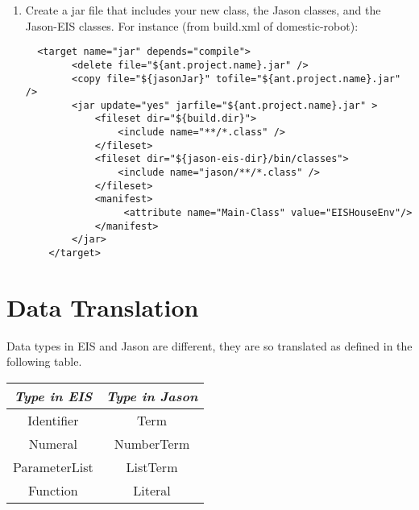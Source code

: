 \documentclass{article}
\begin{document}
\begin{enumerate}
\begin{enumerate}


\item Create a jar file that includes your new class, the Jason
  classes, and the Jason-EIS classes. For instance (from build.xml of
  domestic-robot):
\begin{verbatim}
  <target name="jar" depends="compile">
        <delete file="${ant.project.name}.jar" />
        <copy file="${jasonJar}" tofile="${ant.project.name}.jar" />
        <jar update="yes" jarfile="${ant.project.name}.jar" >
            <fileset dir="${build.dir}">
                <include name="**/*.class" />
            </fileset>
            <fileset dir="${jason-eis-dir}/bin/classes">
                <include name="jason/**/*.class" />
            </fileset>
            <manifest>
                 <attribute name="Main-Class" value="EISHouseEnv"/>
            </manifest>
        </jar>      
    </target>
\end{verbatim}
\end{enumerate}



\section*{Data Translation}

Data types in EIS and Jason are different, they are so translated as
defined in the following table.

\begin{tabular}{cc}
  \emph{Type in EIS} & \emph{Type in Jason} \\ \hline
  Identifier & Term \\
  Numeral  & NumberTerm \\
  ParameterList & ListTerm \\
  Function & Literal
\end{tabular}

\end{enumerate}
\end{document}
